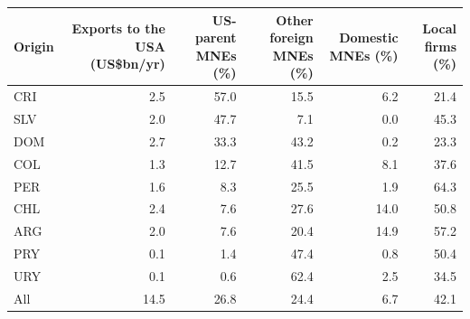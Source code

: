 \begin{tabular}{lrrrrr}
\toprule
Origin & Exports to the USA (US\$bn/yr) & US-parent MNEs (\%) & Other foreign MNEs (\%) & Domestic MNEs (\%) & Local firms (\%) \\
\midrule
CRI & 2.5 & 57.0 & 15.5 & 6.2 & 21.4 \\
SLV & 2.0 & 47.7 & 7.1 & 0.0 & 45.3 \\
DOM & 2.7 & 33.3 & 43.2 & 0.2 & 23.3 \\
COL & 1.3 & 12.7 & 41.5 & 8.1 & 37.6 \\
PER & 1.6 & 8.3 & 25.5 & 1.9 & 64.3 \\
CHL & 2.4 & 7.6 & 27.6 & 14.0 & 50.8 \\
ARG & 2.0 & 7.6 & 20.4 & 14.9 & 57.2 \\
PRY & 0.1 & 1.4 & 47.4 & 0.8 & 50.4 \\
URY & 0.1 & 0.6 & 62.4 & 2.5 & 34.5 \\
\midrule
All & 14.5 & 26.8 & 24.4 & 6.7 & 42.1 \\
\bottomrule
\end{tabular}
